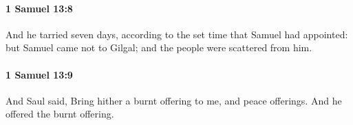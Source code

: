 		\paragraph{1 Samuel 13:8} %
			\label{1SAMUEL-13-8}

			And he tarried seven days, according to the set time that Samuel had appointed: but Samuel came not to Gilgal; and the people were scattered from him.


		\paragraph{1 Samuel 13:9} %
			\label{1SAMUEL-13-9}

			And Saul said, Bring hither a burnt offering to me, and peace offerings. And he offered the burnt offering.


